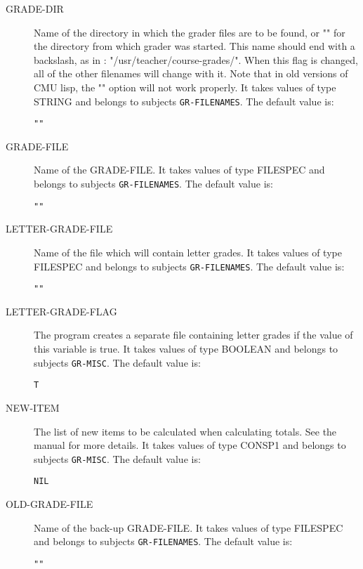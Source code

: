 \begin{description}
\item[GRADE-DIR]  
Name of the directory in which the grader files are to be found,
or "" for the directory from which grader was started. This name should 
end with a backslash, as in : "/usr/teacher/course-grades/".
When this flag is changed, all of the other filenames will change with it.
Note that in old versions of CMU lisp, the "" option will not work properly.
It takes values of type STRING and belongs to subjects \texttt{GR-FILENAMES}.  The default value is: \begin{lstlisting}
""
\end{lstlisting}

\item[GRADE-FILE]  
Name of the GRADE-FILE.
It takes values of type FILESPEC and belongs to subjects \texttt{GR-FILENAMES}.  The default value is: \begin{lstlisting}
""
\end{lstlisting}

\item[LETTER-GRADE-FILE]  
Name of the file which will contain letter grades.
It takes values of type FILESPEC and belongs to subjects \texttt{GR-FILENAMES}.  The default value is: \begin{lstlisting}
""
\end{lstlisting}

\item[LETTER-GRADE-FLAG]  
The program creates a separate file containing letter grades
	 if the value of this variable is true.
It takes values of type BOOLEAN and belongs to subjects \texttt{GR-MISC}.  The default value is: \begin{lstlisting}
T
\end{lstlisting}

\item[NEW-ITEM]  
The list of new items to be calculated when calculating
	 totals. See the manual for more details.
It takes values of type CONSP1 and belongs to subjects \texttt{GR-MISC}.  The default value is: \begin{lstlisting}
NIL
\end{lstlisting}

\item[OLD-GRADE-FILE]  
Name of the back-up GRADE-FILE.
It takes values of type FILESPEC and belongs to subjects \texttt{GR-FILENAMES}.  The default value is: \begin{lstlisting}
""
\end{lstlisting}


\end{description}
